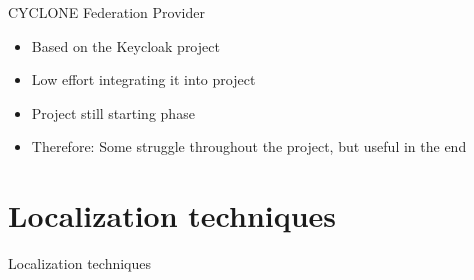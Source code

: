 \documentclass[11pt]{beamer}
\begin{document}
\begin{frame}{CYCLONE Federation Provider}

  \begin{itemize}

    \item Based on the Keycloak project
    \item Low effort integrating it into project
    \item Project still starting phase
    \item Therefore: Some struggle throughout the project, but useful in the end

  \end{itemize}

\end{frame}




\section{Localization techniques}

\begin{frame}{}

  \begin{center}

    {\Huge Localization techniques}

  \end{center}

\end{frame}
\end{document}
